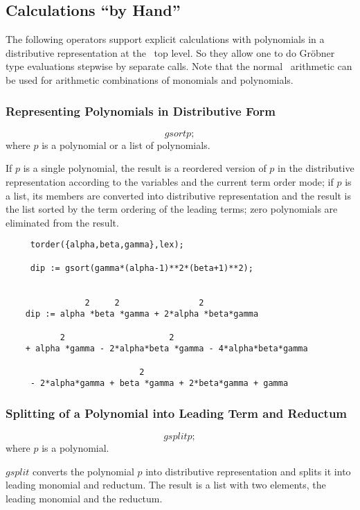 \subsection{Calculations ``by Hand''}
The following operators support explicit calculations with
polynomials in a distributive representation at the \REDUCE \  top level.
So they allow one to do Gr\"obner type evaluations stepwise by
separate calls. Note that the normal \REDUCE \  arithmetic can be used
for arithmetic combinations of monomials and polynomials.

\subsubsection{Representing Polynomials in Distributive Form}
\[ gsort p; \]
where $p$ is a polynomial or a list of polynomials.

If $p$ is a single polynomial, the result is a reordered version of $p$
in the distributive representation according to the variables and the
current term order mode; if $p$ is a list, its members are converted
into distributive representation and the result is the list sorted by
the term ordering of the leading terms; zero polynomials are
eliminated from the result.

\begin{verbatim}
     torder({alpha,beta,gamma},lex);

     dip := gsort(gamma*(alpha-1)**2*(beta+1)**2);


                2     2                2
    dip := alpha *beta *gamma + 2*alpha *beta*gamma

           2                     2
    + alpha *gamma - 2*alpha*beta *gamma - 4*alpha*beta*gamma

                           2
     - 2*alpha*gamma + beta *gamma + 2*beta*gamma + gamma

 \end{verbatim}

\subsubsection{Splitting of a Polynomial into Leading Term and Reductum}
\[ gsplit p; \]
where $p$ is a polynomial.

$gsplit$ converts the polynomial $p$ into distributive representation
and splits it into leading monomial and reductum. The result is a list
with two elements, the leading monomial and the reductum.

